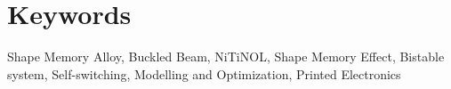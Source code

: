 \section{Keywords}\label{sec:keywords}
Shape Memory Alloy, Buckled Beam, NiTiNOL, Shape Memory Effect, Bistable system, Self-switching, Modelling and Optimization, Printed Electronics
